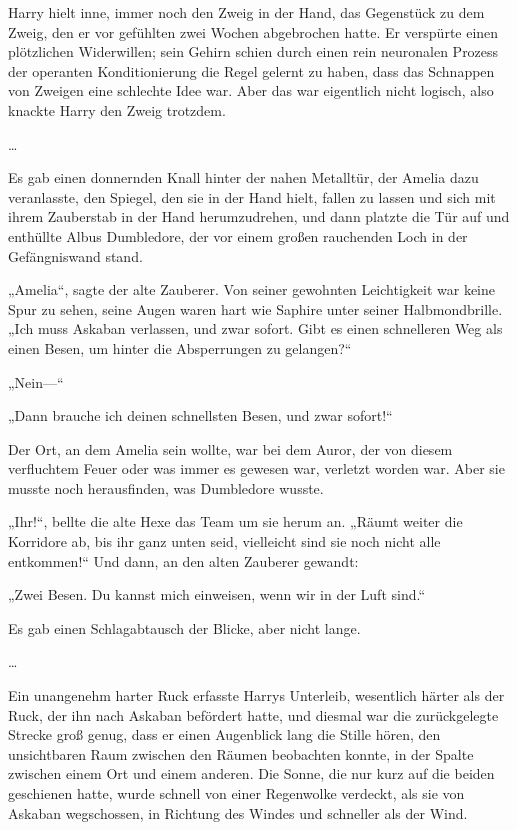 {Harry hielt inne, immer noch den Zweig in der Hand, das Gegenstück zu dem Zweig, den er vor gefühlten zwei Wochen abgebrochen hatte. Er verspürte einen plötzlichen Widerwillen; sein Gehirn schien durch einen rein neuronalen Prozess der operanten Konditionierung die Regel gelernt zu haben, dass das Schnappen von Zweigen eine schlechte Idee war. Aber das war eigentlich nicht logisch, also knackte Harry den Zweig trotzdem.

…

Es gab einen donnernden Knall hinter der nahen Metalltür, der Amelia dazu veranlasste, den Spiegel, den sie in der Hand hielt, fallen zu lassen und sich mit ihrem Zauberstab in der Hand herumzudrehen, und dann platzte die Tür auf und enthüllte Albus Dumbledore, der vor einem großen rauchenden Loch in der Gefängniswand stand.

„Amelia“, sagte der alte Zauberer. Von seiner gewohnten Leichtigkeit war keine Spur zu sehen, seine Augen waren hart wie Saphire unter seiner Halbmondbrille. „Ich muss Askaban verlassen, und zwar sofort. Gibt es einen schnelleren Weg als einen Besen, um hinter die Absperrungen zu gelangen?“

„Nein—“

„Dann brauche ich deinen schnellsten Besen, und zwar sofort!“

Der Ort, an dem Amelia sein wollte, war bei dem Auror, der von diesem verfluchtem Feuer oder was immer es gewesen war, verletzt worden war. Aber sie musste noch herausfinden, was Dumbledore wusste.

„Ihr!“, bellte die alte Hexe das Team um sie herum an. „Räumt weiter die Korridore ab, bis ihr ganz unten seid, vielleicht sind sie noch nicht alle entkommen!“ Und dann, an den alten Zauberer gewandt:

„Zwei Besen. Du kannst mich einweisen, wenn wir in der Luft sind.“

Es gab einen Schlagabtausch der Blicke, aber nicht lange.

…

Ein unangenehm harter Ruck erfasste Harrys Unterleib, wesentlich härter als der Ruck, der ihn nach Askaban befördert hatte, und diesmal war die zurückgelegte Strecke groß genug, dass er einen Augenblick lang die Stille hören, den unsichtbaren Raum zwischen den Räumen beobachten konnte, in der Spalte zwischen einem Ort und einem anderen. Die Sonne, die nur kurz auf die beiden geschienen hatte, wurde schnell von einer Regenwolke verdeckt, als sie von Askaban wegschossen, in Richtung des Windes und schneller als der Wind.

}
